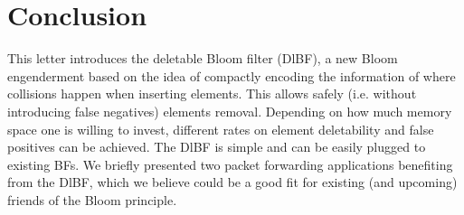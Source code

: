 \documentclass[conference]{IEEEtran}
\begin{document}
\section{Conclusion}

This letter introduces the deletable Bloom filter (DlBF), a new Bloom engenderment based on the idea of compactly encoding the information of where collisions happen when inserting elements. This allows safely (i.e. without introducing false negatives) elements removal. Depending on how much memory space one is willing to invest, different rates on element deletability and false positives can be achieved. 
The DlBF is simple and can be easily plugged to existing BFs. We briefly presented two packet forwarding applications benefiting from the DlBF, which we believe could be a good fit for existing (and upcoming) friends of the Bloom principle.











\end{document}
